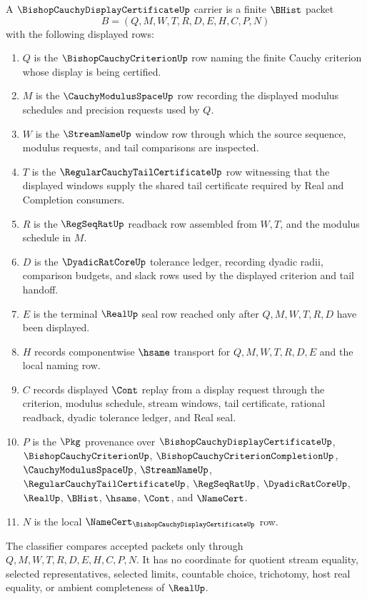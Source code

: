 \begin{definition}
\label{def:bishop-cauchy-display-certificate-carrier}
A $\BishopCauchyDisplayCertificateUp$ carrier is a finite $\BHist$ packet
$$
B=(Q,M,W,T,R,D,E,H,C,P,N)
$$
with the following displayed rows:
\begin{enumerate}
\item $Q$ is the $\BishopCauchyCriterionUp$ row naming the finite Cauchy criterion whose display is being certified.
\item $M$ is the $\CauchyModulusSpaceUp$ row recording the displayed modulus schedules and precision requests used by $Q$.
\item $W$ is the $\StreamNameUp$ window row through which the source sequence, modulus requests, and tail comparisons are inspected.
\item $T$ is the $\RegularCauchyTailCertificateUp$ row witnessing that the displayed windows supply the shared tail certificate required by Real and Completion consumers.
\item $R$ is the $\RegSeqRatUp$ readback row assembled from $W,T$, and the modulus schedule in $M$.
\item $D$ is the $\DyadicRatCoreUp$ tolerance ledger, recording dyadic radii, comparison budgets, and slack rows used by the displayed criterion and tail handoff.
\item $E$ is the terminal $\RealUp$ seal row reached only after $Q,M,W,T,R,D$ have been displayed.
\item $H$ records componentwise $\hsame$ transport for $Q,M,W,T,R,D,E$ and the local naming row.
\item $C$ records displayed $\Cont$ replay from a display request through the criterion, modulus schedule, stream windows, tail certificate, rational readback, dyadic tolerance ledger, and Real seal.
\item $P$ is the $\Pkg$ provenance over $\BishopCauchyDisplayCertificateUp$, $\BishopCauchyCriterionUp$, $\BishopCauchyCriterionCompletionUp$, $\CauchyModulusSpaceUp$, $\StreamNameUp$, $\RegularCauchyTailCertificateUp$, $\RegSeqRatUp$, $\DyadicRatCoreUp$, $\RealUp$, $\BHist$, $\hsame$, $\Cont$, and $\NameCert$.
\item $N$ is the local $\NameCert_{\BishopCauchyDisplayCertificateUp}$ row.
\end{enumerate}
The classifier compares accepted packets only through $Q,M,W,T,R,D,E,H,C,P,N$. It has no coordinate for quotient stream equality, selected representatives, selected limits, countable choice, trichotomy, host real equality, or ambient completeness of $\RealUp$.
\end{definition}

